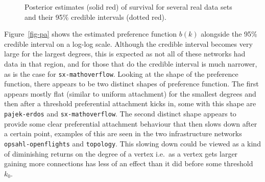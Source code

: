 \documentclass[
  sn-basic,
]{sn-jnl}
\theoremstyle{plain}
\theoremstyle{plain}
\theoremstyle{remark}
\begin{document}
\begin{figure}


\caption{\label{fig-shapes}Posterior estimates (solid red) of survival
for several real data sets and their 95\% credible intervals (dotted
red).}

\end{figure}%

Figure~\ref{fig-pa} shows the estimated preference function \(b(k)\)
alongside the 95\% credible interval on a log-log scale. Although the
credible interval becomes very large for the largest degrees, this is
expected as not all of these networks had data in that region, and for
those that do the credible interval is much narrower, as is the case for
\texttt{sx-mathoverflow}. Looking at the shape of the preference
function, there appears to be two distinct shapes of preference
function. The first appears mostly flat (similar to uniform attachment)
for the smallest degrees and then after a threshold preferential
attachment kicks in, some with this shape are \texttt{pajek-erdos} and
\texttt{sx-mathoverflow}. The second distinct shape appears to provide
some clear preferential attachment behaviour that then slows down after
a certain point, examples of this are seen in the two infrastructure
networks \texttt{opsahl-openflights} and \texttt{topology}. This slowing
down could be viewed as a kind of diminishing returns on the degree of a
vertex i.e.~as a vertex gets larger gaining more connections has less of
an effect than it did before some threshold \(k_0\).
\end{document}
